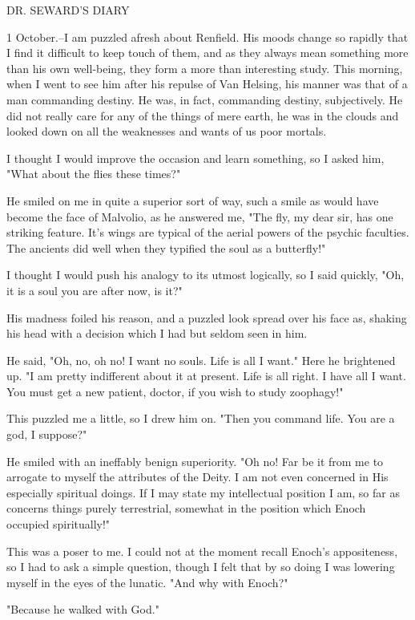DR. SEWARD'S DIARY 

1 October.--I am puzzled afresh about Renfield. His moods change so rapidly that I find it difficult to keep touch of them, and as they always mean something more than his own well-being, they form a more than interesting study. This morning, when I went to see him after his repulse of Van Helsing, his manner was that of a man commanding destiny. He was, in fact, commanding destiny, subjectively. He did not really care for any of the things of mere earth, he was in the clouds and looked down on all the weaknesses and wants of us poor mortals. 

I thought I would improve the occasion and learn something, so I asked him, "What about the flies these times?" 

He smiled on me in quite a superior sort of way, such a smile as would have become the face of Malvolio, as he answered me, "The fly, my dear sir, has one striking feature. It's wings are typical of the aerial powers of the psychic faculties. The ancients did well when they typified the soul as a butterfly!" 

I thought I would push his analogy to its utmost logically, so I said quickly, "Oh, it is a soul you are after now, is it?" 

His madness foiled his reason, and a puzzled look spread over his face as, shaking his head with a decision which I had but seldom seen in him. 

He said, "Oh, no, oh no! I want no souls. Life is all I want." Here he brightened up. "I am pretty indifferent about it at present. Life is all right. I have all I want. You must get a new patient, doctor, if you wish to study zoophagy!" 

This puzzled me a little, so I drew him on. "Then you command life. You are a god, I suppose?" 

He smiled with an ineffably benign superiority. "Oh no! Far be it from me to arrogate to myself the attributes of the Deity. I am not even concerned in His especially spiritual doings. If I may state my intellectual position I am, so far as concerns things purely terrestrial, somewhat in the position which Enoch occupied spiritually!" 

This was a poser to me. I could not at the moment recall Enoch's appositeness, so I had to ask a simple question, though I felt that by so doing I was lowering myself in the eyes of the lunatic. "And why with Enoch?" 

"Because he walked with God." 

